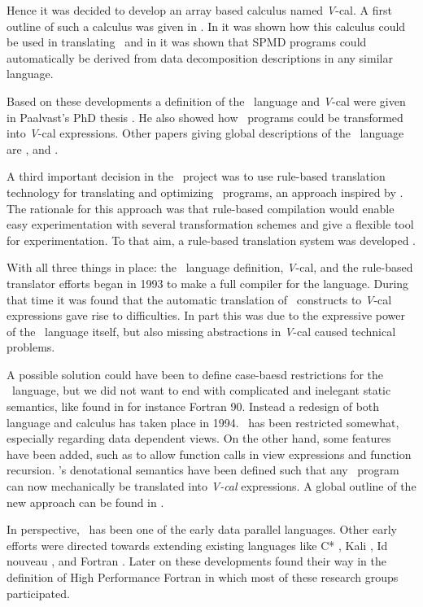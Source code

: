 Hence it was decided to develop an array based calculus named {\sl
V}-cal.  A first outline of such a calculus was given in
\cite{vanGemund89}. In \cite{Paalvast90} it was shown how this
calculus could be used in translating \Booster\ and in \cite{Paalvast91}
it was shown that SPMD programs could automatically be derived from
data decomposition descriptions in any similar language.

Based on these developments a definition of the \Booster\ language and
{\sl V}-cal were given in Paalvast's PhD thesis
\cite{Paalvast92}. He also showed how \Booster\ programs could be
transformed into {\sl V}-cal expressions. Other papers giving global
descriptions of the \Booster\ language are \cite{Paalvast91a}, and
\cite{deJong92}.

A third important decision in the \Booster\ project was to use
rule-based translation technology for translating and optimizing
\Booster\ programs, an approach inspired by \cite{Wang91}. The rationale
for this approach was that rule-based compilation would enable easy
experimentation with several transformation schemes and give a
flexible tool for experimentation. To that aim, a rule-based
translation system was developed \cite{Breebaart92}
\cite{Breebaart92a}.

With all three things in place: the \Booster\ language definition,
{\sl V}-cal, and the rule-based translator efforts began in 1993 to
make a full compiler for the language. During that time it was found
that the automatic translation of \Booster\ constructs to {\sl V}-cal
expressions gave rise to difficulties. In part this was due to the
expressive power of the \Booster\ language itself, but also missing
abstractions in {\sl V}-cal caused technical problems. 

A possible solution could have been to define case-baesd restrictions
for the \Booster\ language, but we did not want to end with complicated
and inelegant static semantics, like found in for instance Fortran 90.
Instead a redesign of both language and calculus has taken place in
1994.  \Booster\ has been restricted somewhat, especially regarding
data dependent views. On the other hand, some features have been
added, such as to allow function calls in view expressions and
function recursion. \Booster's denotational semantics have been
defined such that any \Booster\ program can now mechanically be
translated into {\sl V-cal} expressions.  A global outline of the new
approach can be found in \cite{Trescher94}.

In perspective, \Booster\ has been one of the early data parallel
languages.  Other early efforts were directed towards extending
existing languages like C* \cite{Quinn89}, Kali \cite{Koelbel91}, Id
nouveau \cite{Rogers89}, and Fortran \cite{Gerndt89}
\cite{Callahan88}. Later on these developments found their way in the
definition of High Performance Fortran \cite{HPFF93} in which most of
these research groups participated.
